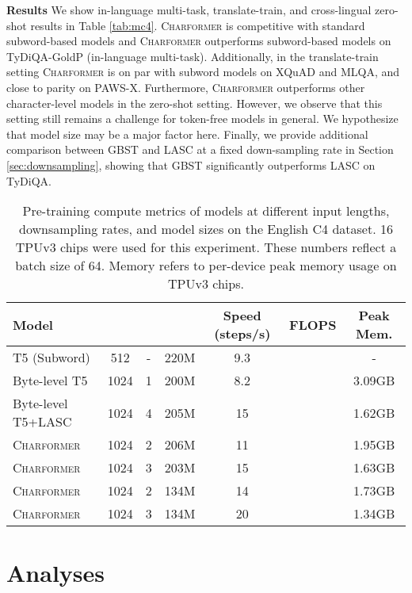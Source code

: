 \documentclass{article} \usepackage{iclr2022_conference,times}
\newcommand{\charformer}{\textsc{Charformer}\xspace}
\newcommand{\charformerbase}{\textsc{Charformer}\xspace}
\newcommand{\charformertall}{\textsc{Charformer}\xspace}
\newcommand{\charformertalllong}{\textsc{Charformer}\xspace}
\newcommand{\bytebase}{Byte-level T5\xspace}
\newcommand{\caninebase}{Byte-level T5+LASC\xspace}
\begin{document}
\noindent \textbf{Results}  We show in-language multi-task, translate-train, and cross-lingual zero-shot results in Table \ref{tab:mc4}. \charformertall is competitive with standard subword-based models and \charformertalllong outperforms subword-based models on TyDiQA-GoldP (in-language multi-task). Additionally, in the translate-train setting \charformertalllong is on par with subword models on XQuAD and MLQA, and close to parity on PAWS-X. Furthermore, \charformer outperforms other character-level models in the zero-shot setting. However, we observe that this setting still remains a challenge for token-free models in general. We hypothesize that model size may be a major factor here. Finally, we provide additional comparison between GBST and LASC at a fixed down-sampling rate in Section \ref{sec:downsampling}, showing that GBST significantly outperforms LASC on TyDiQA.  



\begin{table} \small
    \centering
    \caption{Pre-training compute metrics of models at different input lengths, downsampling rates, and model sizes on the English C4 dataset. 16 TPUv3 chips were used for this experiment. These numbers reflect a batch size of 64. Memory refers to per-device peak memory usage on TPUv3 chips. }
    \label{tab:perf}
    \begin{tabular}{l c c cccc}
    \toprule 
     Model &  &  &   & Speed (steps/s) & FLOPS & Peak Mem.\\
     \midrule
T5 (Subword) & 512 & - & 220M & 9.3 &  & - \\
\cmidrule{1-7}
\bytebase & 1024 & 1 & 200M& 8.2 &  &  3.09GB \\
      \caninebase & 1024 & 4 & 205M& 15 &  & 1.62GB\\
      \charformerbase & 1024  & 2 & 206M & 11  &  & 1.95GB\\
      \charformerbase & 1024  & 3 & 203M & 15 &  & 1.63GB\\
      \charformertall & 1024 & 2 & 134M & 14 &  &  1.73GB\\
       \charformertall & 1024 & 3 & 134M & 20 &  & 1.34GB
\\
      \bottomrule
\end{tabular}
\end{table}

\section{Analyses}
\end{document}
